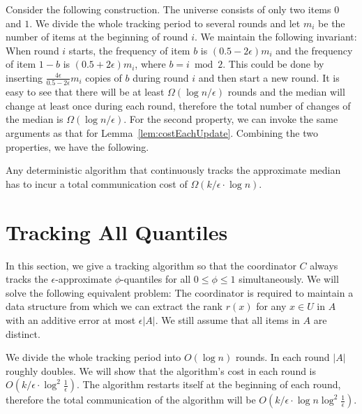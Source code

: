 \documentclass[10pt]{article}
\newcommand{\eps}{\epsilon}
\begin{document}
Consider the following construction. The universe consists of only
two items $0$ and $1$. We divide the whole tracking period to
several rounds and let $m_i$ be the number of items at the
beginning of round $i$. We maintain the following invariant: When
round $i$ starts, the frequency of item $b$ is $(0.5 -
2\eps)m_i$ and the frequency of item $1-b$ is $(0.5 +
2\eps)m_i$, where $b = i \bmod 2$. This could be done by inserting
$\frac{4\eps}{0.5 - 2\eps} m_i$ copies of $b$ during round $i$
and then start a new round. It is easy to see that there will be
at least $\Omega(\log n/\eps)$ rounds and the median will change
at least once during each round, therefore the total number of
changes of the median is $\Omega(\log n/\eps)$. For the second
property, we can invoke the same arguments as that for
Lemma~\ref{lem:costEachUpdate}.
Combining the two properties, we have the following.

\begin{theorem}
\label{thm:lowerbound-median}
  Any deterministic algorithm that continuously tracks the approximate
  median has to incur a total communication cost of
  $\Omega(k/\eps\cdot \log n)$.
\end{theorem}




 
\newcommand{\T}{\mathcal{T}}
\newcommand{\hmax}{h}

\section{Tracking All Quantiles}
\label{sec:tracking-quantiles}

In this section, we give a tracking algorithm so that the
coordinator $C$ always tracks the $\eps$-approximate
$\phi$-quantiles for all $0\le \phi \le 1$ simultaneously.  We will solve
the
following equivalent problem: The coordinator is required to
maintain a data structure from which we can extract the rank
$r(x)$ for any $x\in U$ in $A$ with an additive error at most
$\eps |A|$. We still assume that all items in $A$ are distinct.

We divide the whole tracking period into $O(\log n)$ rounds.  In each round
$|A|$ roughly doubles. We will show that the algorithm's cost in each round
is $O(k/\eps \cdot \log^2\frac{1}{\eps})$.  The algorithm restarts itself
at the beginning of each round, therefore the total communication of the
algorithm will be $O(k/\eps \cdot \log n \log^2\frac{1}{\eps})$.
\end{document}

